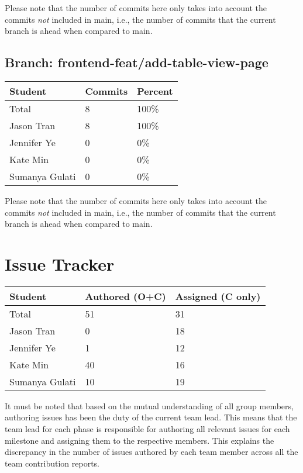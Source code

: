 \documentclass{article}
\begin{document}
Please note that the number of commits here only takes into account the commits \emph{not}
included in main, i.e., the number of commits that the current branch is ahead when compared 
to main.

\subsection{Branch: frontend-feat/add-table-view-page}

\begin{table}[H]
\centering
\begin{tabular}{lll}
\toprule
\textbf{Student} & \textbf{Commits} & \textbf{Percent}\\
\midrule
Total & 8 & 100\% \\
Jason Tran & 8 & 100\% \\
Jennifer Ye & 0 & 0\% \\
Kate Min & 0 & 0\% \\
Sumanya Gulati & 0 & 0\% \\
\bottomrule
\end{tabular}
\end{table}

Please note that the number of commits here only takes into account the commits \emph{not}
included in main, i.e., the number of commits that the current branch is ahead when compared 
to main.

\section{Issue Tracker}

\begin{table}[H]
\centering
\begin{tabular}{lll}
\toprule
\textbf{Student} & \textbf{Authored (O+C)} & \textbf{Assigned (C only)}\\
\midrule
Total & 51 & 31 \\
Jason Tran & 0 & 18 \\
Jennifer Ye & 1 & 12 \\
Kate Min & 40 & 16 \\
Sumanya Gulati & 10 & 19 \\
\bottomrule
\end{tabular}
\end{table}

It must be noted that based on the mutual understanding of all group members, authoring issues has been the duty of the 
current team lead. This means that the team lead for each phase is responsible for authoring all relevant issues for each 
milestone and assigning them to the respective members. This explains the discrepancy in the number of issues authored by 
each team member across all the team contribution reports.
\end{document}
